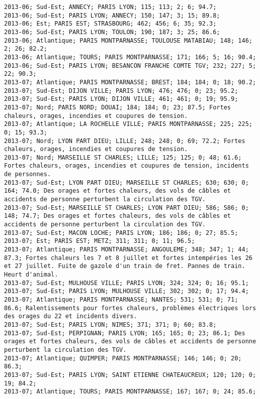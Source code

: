 \documentclass{article}
\begin{document}
\begin{Verbatim}[commandchars=\\\{\}]
2013-06; Sud-Est; ANNECY; PARIS LYON; 115; 113; 2; 6; 94.7; 
2013-06; Sud-Est; PARIS LYON; ANNECY; 150; 147; 3; 15; 89.8; 
2013-06; Est; PARIS EST; STRASBOURG; 462; 456; 6; 35; 92.3; 
2013-06; Sud-Est; PARIS LYON; TOULON; 190; 187; 3; 25; 86.6; 
2013-06; Atlantique; PARIS MONTPARNASSE; TOULOUSE MATABIAU; 148; 146; 2; 26; 82.2; 
2013-06; Atlantique; TOURS; PARIS MONTPARNASSE; 171; 166; 5; 16; 90.4; 
2013-06; Sud-Est; PARIS LYON; BESANCON FRANCHE COMTE TGV; 232; 227; 5; 22; 90.3; 
2013-07; Atlantique; PARIS MONTPARNASSE; BREST; 184; 184; 0; 18; 90.2; 
2013-07; Sud-Est; DIJON VILLE; PARIS LYON; 476; 476; 0; 23; 95.2; 
2013-07; Sud-Est; PARIS LYON; DIJON VILLE; 461; 461; 0; 19; 95.9; 
2013-07; Nord; PARIS NORD; DOUAI; 184; 184; 0; 23; 87.5; Fortes chaleurs, orages, incendies et coupures de tension.
2013-07; Atlantique; LA ROCHELLE VILLE; PARIS MONTPARNASSE; 225; 225; 0; 15; 93.3; 
2013-07; Nord; LYON PART DIEU; LILLE; 248; 248; 0; 69; 72.2; Fortes chaleurs, orages, incendies et coupures de tension.
2013-07; Nord; MARSEILLE ST CHARLES; LILLE; 125; 125; 0; 48; 61.6; Fortes chaleurs, orages, incendies et coupures de tension, incidents de personnes.
2013-07; Sud-Est; LYON PART DIEU; MARSEILLE ST CHARLES; 630; 630; 0; 164; 74.0; Des orages et fortes chaleurs, des vols de câbles et accidents de personne perturbent la circulation des TGV.
2013-07; Sud-Est; MARSEILLE ST CHARLES; LYON PART DIEU; 586; 586; 0; 148; 74.7; Des orages et fortes chaleurs, des vols de câbles et accidents de personne perturbent la circulation des TGV.
2013-07; Sud-Est; MACON LOCHE; PARIS LYON; 186; 186; 0; 27; 85.5; 
2013-07; Est; PARIS EST; METZ; 311; 311; 0; 11; 96.5; 
2013-07; Atlantique; PARIS MONTPARNASSE; ANGOULEME; 348; 347; 1; 44; 87.3; Fortes chaleurs les 7 et 8 juillet et fortes intempéries les 26 et 27 juillet. Fuite de gazole d'un train de fret. Pannes de train. Heurt d'animal.
2013-07; Sud-Est; MULHOUSE VILLE; PARIS LYON; 324; 324; 0; 16; 95.1; 
2013-07; Sud-Est; PARIS LYON; MULHOUSE VILLE; 302; 302; 0; 17; 94.4; 
2013-07; Atlantique; PARIS MONTPARNASSE; NANTES; 531; 531; 0; 71; 86.6; Ralentissements pour fortes chaleurs, problèmes électriques lors des orages du 22 et incidents divers.
2013-07; Sud-Est; PARIS LYON; NIMES; 371; 371; 0; 60; 83.8; 
2013-07; Sud-Est; PERPIGNAN; PARIS LYON; 165; 165; 0; 23; 86.1; Des orages et fortes chaleurs, des vols de câbles et accidents de personne perturbent la circulation des TGV.
2013-07; Atlantique; QUIMPER; PARIS MONTPARNASSE; 146; 146; 0; 20; 86.3; 
2013-07; Sud-Est; PARIS LYON; SAINT ETIENNE CHATEAUCREUX; 120; 120; 0; 19; 84.2; 
2013-07; Atlantique; TOURS; PARIS MONTPARNASSE; 167; 167; 0; 24; 85.6; 

\end{Verbatim}
\end{document}
